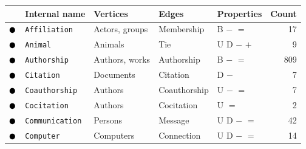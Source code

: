 \begin{tabular}{lllllr}
\toprule
& \textbf{Internal name} & \textbf{Vertices} & \textbf{Edges} & \textbf{Properties} & \textbf{Count} \\
\midrule
\textcolor{colorAffiliation}{$\newmoon$} &\texttt{Affiliation} & Actors, groups & Membership & \phantom{U} \phantom{D} B $-$ $=$ \phantom{$+$} \phantom{$\pm$} \phantom{$\stackrel{+}{=}$} \phantom{$*$} \phantom{$_*{}^*$} \phantom{$\rightleftharpoons$} \phantom{$++$}  &  17\\
\textcolor{colorAnimal}{$\newmoon$} &\texttt{Animal} & Animals & Tie & U D \phantom{B} $-$ \phantom{$=$} $+$ \phantom{$\pm$} \phantom{$\stackrel{+}{=}$} \phantom{$*$} \phantom{$_*{}^*$} \phantom{$\rightleftharpoons$} \phantom{$++$}  &  9\\
\textcolor{colorAuthorship}{$\newmoon$} &\texttt{Authorship} & Authors, works & Authorship & \phantom{U} \phantom{D} B $-$ $=$ \phantom{$+$} \phantom{$\pm$} \phantom{$\stackrel{+}{=}$} \phantom{$*$} \phantom{$_*{}^*$} \phantom{$\rightleftharpoons$} \phantom{$++$}  &  809\\
\textcolor{colorCitation}{$\newmoon$} &\texttt{Citation} & Documents & Citation & \phantom{U} D \phantom{B} $-$ \phantom{$=$} \phantom{$+$} \phantom{$\pm$} \phantom{$\stackrel{+}{=}$} \phantom{$*$} \phantom{$_*{}^*$} \phantom{$\rightleftharpoons$} \phantom{$++$}  &  7\\
\textcolor{colorCoauthorship}{$\newmoon$} &\texttt{Coauthorship} & Authors & Coauthorship & U \phantom{D} \phantom{B} $-$ $=$ \phantom{$+$} \phantom{$\pm$} \phantom{$\stackrel{+}{=}$} \phantom{$*$} \phantom{$_*{}^*$} \phantom{$\rightleftharpoons$} \phantom{$++$}  &  7\\
\textcolor{colorCocitation}{$\newmoon$} &\texttt{Cocitation} & Authors & Cocitation & U \phantom{D} \phantom{B} \phantom{$-$} $=$ \phantom{$+$} \phantom{$\pm$} \phantom{$\stackrel{+}{=}$} \phantom{$*$} \phantom{$_*{}^*$} \phantom{$\rightleftharpoons$} \phantom{$++$}  &  2\\
\textcolor{colorCommunication}{$\newmoon$} &\texttt{Communication} & Persons & Message & U D \phantom{B} $-$ $=$ \phantom{$+$} \phantom{$\pm$} \phantom{$\stackrel{+}{=}$} \phantom{$*$} \phantom{$_*{}^*$} \phantom{$\rightleftharpoons$} \phantom{$++$}  &  42\\
\textcolor{colorComputer}{$\newmoon$} &\texttt{Computer} & Computers & Connection & U D \phantom{B} $-$ $=$ \phantom{$+$} \phantom{$\pm$} \phantom{$\stackrel{+}{=}$} \phantom{$*$} \phantom{$_*{}^*$} \phantom{$\rightleftharpoons$} \phantom{$++$}  &  14\\

\end{tabular}

